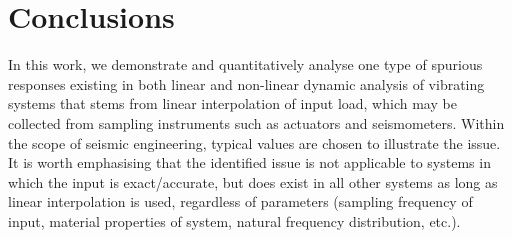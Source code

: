 \section{Conclusions}
In this work, we demonstrate and quantitatively analyse one type of spurious responses existing in both linear and non-linear dynamic analysis of vibrating systems that stems from linear interpolation of input load, which may be collected from sampling instruments such as actuators and seismometers. Within the scope of seismic engineering, typical values are chosen to illustrate the issue. It is worth emphasising that the identified issue is not applicable to systems in which the input is exact/accurate, but does exist in all other systems as long as linear interpolation is used, regardless of parameters (sampling frequency of input, material properties of system, natural frequency distribution, etc.).

